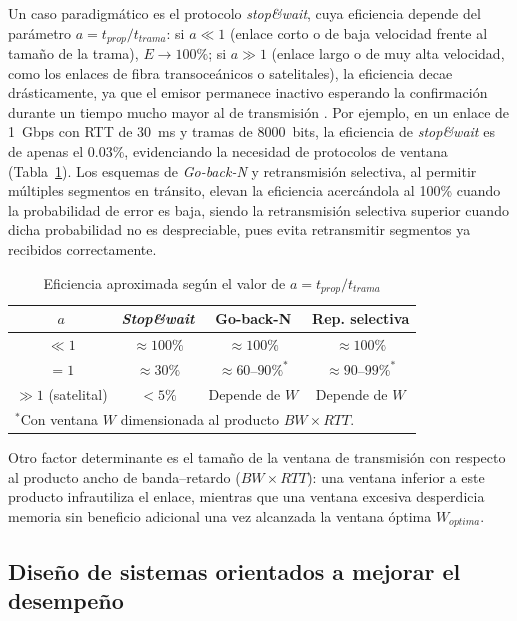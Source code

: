 \documentclass[conference]{IEEEtran}
\begin{document}
Un caso paradigmático es el protocolo \textit{stop\&wait}, cuya eficiencia depende del parámetro $a = t_{prop}/t_{trama}$: si $a\ll1$ (enlace corto o de baja velocidad frente al tamaño de la trama), $E\to100\%$; si $a\gg1$ (enlace largo o de muy alta velocidad, como los enlaces de fibra transoceánicos o satelitales), la eficiencia decae drásticamente, ya que el emisor permanece inactivo esperando la confirmación durante un tiempo mucho mayor al de transmisión \cite{fuoc}. Por ejemplo, en un enlace de 1~Gbps con RTT de 30~ms y tramas de 8000~bits, la eficiencia de \textit{stop\&wait} es de apenas el 0.03\%, evidenciando la necesidad de protocolos de ventana (Tabla~\ref{tab:eficiencia}). Los esquemas de \textit{Go-back-N} y retransmisión selectiva, al permitir múltiples segmentos en tránsito, elevan la eficiencia acercándola al 100\% cuando la probabilidad de error es baja, siendo la retransmisión selectiva superior cuando dicha probabilidad no es despreciable, pues evita retransmitir segmentos ya recibidos correctamente.

\begin{table}[htbp]
\caption{Eficiencia aproximada según el valor de $a=t_{prop}/t_{trama}$}
\label{tab:eficiencia}
\centering
\begin{tabular}{|c|c|c|c|}
\hline
\textbf{$a$} & \textbf{\textit{Stop\&wait}} & \textbf{Go-back-N} & \textbf{Rep. selectiva} \\
\hline
$\ll 1$ & $\approx 100\%$ & $\approx 100\%$ & $\approx 100\%$ \\
\hline
$= 1$ & $\approx 30\%$ & $\approx 60$--$90\%^{*}$ & $\approx 90$--$99\%^{*}$ \\
\hline
$\gg 1$ (satelital) & $< 5\%$ & Depende de $W$ & Depende de $W$ \\
\hline
\multicolumn{4}{l}{\footnotesize $^{*}$Con ventana $W$ dimensionada al producto $BW\times RTT$.}
\end{tabular}
\end{table}

Otro factor determinante es el tamaño de la ventana de transmisión con respecto al producto ancho de banda--retardo ($BW\times RTT$): una ventana inferior a este producto infrautiliza el enlace, mientras que una ventana excesiva desperdicia memoria sin beneficio adicional una vez alcanzada la ventana óptima $W_{optima}$.

\subsection{Diseño de sistemas orientados a mejorar el desempeño}
\end{document}
